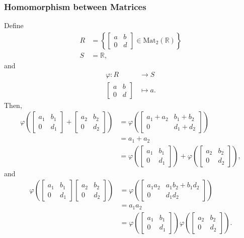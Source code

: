 \documentclass[8pt]{extarticle}
\newcommand{\R}{\mathbb{R}}
\begin{document}
  \subsubsection{Homomorphism between Matrices}%
  Define
  \begin{align*}
    R &= \left\{ \begin{bmatrix}a&b\\0&d\end{bmatrix}\in \text{Mat}_{2}(\R)\right\}\\
    S &= \R,
  \end{align*}
  and
  \begin{align*}
    \varphi:R&\rightarrow S\\
    \begin{bmatrix}a&b\\0&d\end{bmatrix}&\mapsto a.
  \end{align*}
  Then,
  \begin{align*}
    \varphi \left(\begin{bmatrix}a_1&b_1\\0&d_1\end{bmatrix}+\begin{bmatrix}a_2&b_2\\0&d_2\end{bmatrix}\right) &= \varphi \left(\begin{bmatrix}a_1+a_2&b_1+b_2\\0&d_1+d_2\end{bmatrix}\right)\\
                                    &= a_1 + a_2\\
                                    &= \varphi \left(\begin{bmatrix}a_1&b_1\\0&d_1\end{bmatrix}\right) + \varphi \left(\begin{bmatrix}a_2&b_2\\0&d_2\end{bmatrix}\right),
  \end{align*}
  and
  \begin{align*}
    \varphi \left(\begin{bmatrix}a_1&b_1\\0&d_1\end{bmatrix}\begin{bmatrix}a_2&b_2\\0&d_2\end{bmatrix}\right) &= \varphi \left(\begin{bmatrix}a_1a_2&a_1b_2 + b_1d_2\\0&d_1d_2\end{bmatrix}\right)\\
                                    &= a_1 a_2\\
                                    &= \varphi \left(\begin{bmatrix}a_1&b_1\\0&d_1\end{bmatrix}\right)  \varphi \left(\begin{bmatrix}a_2&b_2\\0&d_2\end{bmatrix}\right).
  \end{align*}
\end{document}
